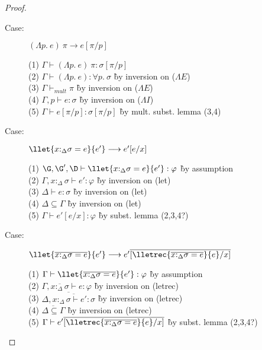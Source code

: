\begin{proof}
\begin{description}
\item[Case:] $(\Lambda p.~e)~\pi \longrightarrow e[\pi/p]$
\begin{tabbing}
(1) $\Gamma \vdash (\Lambda p.~e)~\pi : \sigma[\pi/p]$\\
(2) $\Gamma \vdash (\Lambda p.~e) : \forall p.~\sigma$ \` by inversion on ($\Lambda E$) \\
(3) $\Gamma \vdash_{mult} \pi$ \` by inversion on ($\Lambda E$) \\
(4) $\Gamma, p \vdash e : \sigma$ \` by inversion on ($\Lambda I$) \\
(5) $\Gamma \vdash e[\pi/p]:\sigma[\pi/p]$ \` by mult. subst. lemma (3,4) \\
\end{tabbing}

\item[Case:] $\llet{x{:}_\Delta\sigma = e}{e'}\longrightarrow e'[e/x]$
\begin{tabbing}
(1) $\G, \G', \D\vdash \llet{x{:}_\Delta\sigma = e}{e'} : \varphi$ \` by assumption \\
(2) $\Gamma, x{:}_\Delta\sigma \vdash e' : \varphi$ \` by inversion on (let) \\
(3) $\Delta \vdash e : \sigma$ \` by inversion on (let) \\
(4) $\Delta \subseteq \Gamma$ \` by inversion on (let) \\
(5) $\Gamma \vdash e'[e/x] : \varphi$ \` by subst. lemma (2,3,4?) \\
\end{tabbing}

\item[Case:] $\llet{\overline{x{:}_\Delta\sigma = e}}{e'} \longrightarrow e'\overline{[\lletrec{\overline{x{:}_\Delta\sigma = e}}{e}/x]}$
\begin{tabbing}
(1) $\Gamma \vdash \llet{\overline{x{:}_\Delta\sigma = e}}{e'} : \varphi$ \` by assumption \\
(2) $\Gamma, \overline{x{:}_\Delta\sigma} \vdash e : \varphi$ \` by inversion on (letrec) \\
(3) $\overline{\Delta, \overline{x{:}_\Delta\sigma \vdash e' : \sigma}}$ \` by inversion on (letrec) \\
(4) $\overline{\Delta\subseteq\Gamma}$ \` by inversion on (letrec) \\
(5) $\Gamma \vdash e'\overline{[\lletrec{\overline{x{:}_\Delta\sigma = e}}{e}/x]}$ \` by subst. lemma (2,3,4?) \\
\end{tabbing}


\end{description}
\end{proof}
